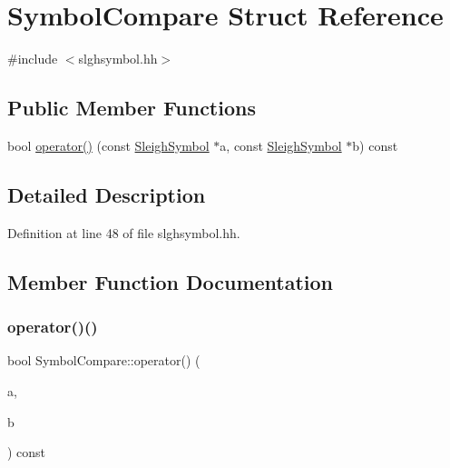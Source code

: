 \hypertarget{struct_symbol_compare}{}\section{Symbol\+Compare Struct Reference}
\label{struct_symbol_compare}


{\ttfamily \#include $<$slghsymbol.\+hh$>$}

\subsection*{Public Member Functions}
\begin{DoxyCompactItemize}
\item 
bool \mbox{\hyperlink{struct_symbol_compare_ad7fc2167a71d2e6308213cbc2575c231}{operator()}} (const \mbox{\hyperlink{class_sleigh_symbol}{Sleigh\+Symbol}} $\ast$a, const \mbox{\hyperlink{class_sleigh_symbol}{Sleigh\+Symbol}} $\ast$b) const
\end{DoxyCompactItemize}


\subsection{Detailed Description}


Definition at line 48 of file slghsymbol.\+hh.



\subsection{Member Function Documentation}
\mbox{\label{struct_symbol_compare_ad7fc2167a71d2e6308213cbc2575c231}} 
\subsubsection{\texorpdfstring{operator()()}{operator()()}}
{\footnotesize\ttfamily bool Symbol\+Compare\+::operator() (\begin{DoxyParamCaption}\item[{const \mbox{\hyperlink{class_sleigh_symbol}{Sleigh\+Symbol}} $\ast$}]{a,  }\item[{const \mbox{\hyperlink{class_sleigh_symbol}{Sleigh\+Symbol}} $\ast$}]{b }\end{DoxyParamCaption}) const\hspace{0.3cm}{\ttfamily [inline]}}



